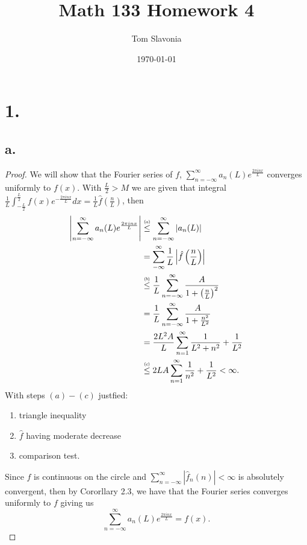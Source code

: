 \documentclass{article}
\title{Math 133 Homework 4}
\author{Tom Slavonia}
\date{\today}
\newcommand\numleq[1]
  {\stackrel{\scriptscriptstyle(\mkern-1.5mu#1\mkern-1.5mu)}{\leq}}
\begin{document}
\maketitle

\section*{1.}
\subsection*{a.}
\begin{proof}
    We will show that the Fourier series of $f$, $\sum\limits_{n = -\infty}^{\infty}a_n(L)e^{\frac{2 \pi inx }{L}}$ converges uniformly to $f(x)$. With $\frac{L}{2} > M$ we are given that integral $\frac{1}{L}\int_{-\frac{L}{2}}^{\frac{L}{2}} f(x)e^{-\frac{2 \pi i nx }{L}} dx= \frac{1}{L}\hat{f}\left(\frac{n}{L}\right) $, then
    \begin{align*}
        \left|\sum\limits_{n = -\infty}^{\infty}a_n(L) e^{\frac{2 \pi i nx}{L}}\right| &\numleq{a} \sum\limits_{n = -\infty}^{\infty}|a_n(L)| \\
        &= \sum\limits_{-\infty}^{\infty} \frac{1}{L} \left|\hat{f}\left(\frac{n}{L} \right) \right| \\
        & \numleq{b} \frac{1}{L} \sum\limits_{n = -\infty}^{\infty} \frac{A}{1 + \left(\frac{n}{L}\right)^2} \\
        &= \frac{1}{L} \sum\limits_{n = -\infty}^{\infty} \frac{A}{1 + \frac{n^2}{L^2}} \\
        &= \frac{2L^2A}{L} \sum\limits_{n = 1}^{\infty} \frac{1}{L^2 + n^2} + \frac{1}{L^2} \\
        &\numleq{c} 2 L A \sum\limits_{n = 1}^{\infty} \frac{1}{n^2} + \frac{1}{L^2} < \infty.
    \end{align*}
    With steps $(a)-(c)$ justfied:
    \begin{enumerate}[\indent(a)]
       \item triangle inequality
       \item $\hat{f}$ having moderate decrease
       \item comparison test.  
    \end{enumerate}
    Since $f$ is continuous on the circle and $\sum\limits_{n = -\infty}^{\infty} |\hat{f}_n(n)| < \infty$ is absolutely convergent, then by Cororllary 2.3, we have that the Fourier series converges uniformly to $f$ giving us
    \[
    \sum\limits_{n = -\infty}^{\infty} a_n(L)e^{\frac{2 \pi i nx}{L}} = f(x).   
    \]
\end{proof}
\end{document}
